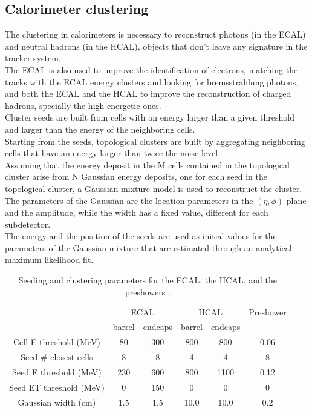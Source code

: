 \subsection{Calorimeter clustering}
The clustering in calorimeters is necessary to reconstruct photons (in the ECAL) and neutral hadrons (in the HCAL), objects that don't leave any signature in the tracker system.\\
The ECAL is also used to improve the identification of electrons, matching the tracks with the ECAL energy clusters and looking for bremsstrahlung photons, and both the ECAL and the HCAL to improve the reconstruction of charged hadrons, specially the high energetic ones.\\
Cluster seeds are built from cells with an energy larger than a given threshold and
larger than the energy of the neighboring cells.\\
Starting from the seeds, topological clusters are built by aggregating neighboring cells that have an energy larger than twice the noise level.\\
Assuming that the energy deposit in the M cells contained in the topological cluster arise from N Gaussian energy deposits, one for each seed in the topological cluster, a Gaussian mixture model is used to reconstruct the cluster. The parameters of the Gaussian are the location parameters in the $(\eta,\phi)$ plane and the amplitude, while the width has a fixed value, different for each subdetector.\\
The energy and the position of the seeds are used as initial values for the parameters of the Gaussian mixture that are estimated through an analytical maximum likelihood fit.\\

\begin{table}[h!]
    \centering
    \begin{tabular}{|c|cc|cc|c|}
    \hline
    &\multicolumn{2}{c|}{ECAL} & \multicolumn{2}{c|}{HCAL} & Preshower\\
    &barrel&endcaps&barrel&endcaps& \\
    \hline
    Cell E threshold (MeV)&80&300&800&800&0.06\\
    Seed \# closest cells&8&8&4&4&8\\
    Seed E threshold (MeV)&230&600&800&1100&0.12\\
    Seed ET threshold (MeV)&0&150&0&0&0\\
    Gaussian width (cm)&1.5&1.5&10.0&10.0&0.2\\
    \hline
    \end{tabular}
    \caption{Seeding and clustering parameters for the ECAL, the HCAL, and the preshowers \cite{Sirunyan2017Particle-flowDetector}.}
    \label{tab:clustering}
\end{table}

